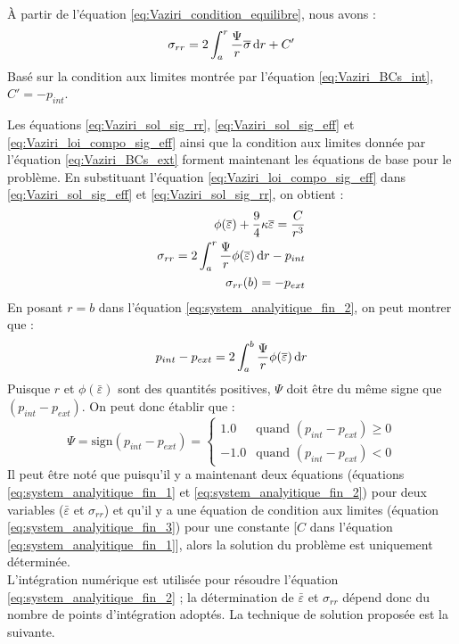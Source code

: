 \documentclass[10pt]{book}
\begin{document}
À partir de l'équation \eqref{eq:Vaziri_condition_equilibre}, nous avons :
\begin{equation}
\sigma_{rr} = 2\int_a^r\frac{\Psi}{r}\overline{\sigma}\,\mathrm{d}r + C'
\label{eq:Vaziri_sol_sig_rr}
\end{equation}
Basé sur la condition aux limites montrée par l'équation \eqref{eq:Vaziri_BCs_int}, $C' = -p_{int}$.

Les équations \eqref{eq:Vaziri_sol_sig_rr}, \eqref{eq:Vaziri_sol_sig_eff} et \eqref{eq:Vaziri_loi_compo_sig_eff} ainsi que la condition aux limites donnée par l'équation \eqref{eq:Vaziri_BCs_ext} forment maintenant les équations de base pour le problème. En substituant l'équation \eqref{eq:Vaziri_loi_compo_sig_eff} dans \eqref{eq:Vaziri_sol_sig_eff} et \eqref{eq:Vaziri_sol_sig_rr}, on obtient :
\begin{align}\label{eq:system_analyitique_fin_1}
\phi(\overline{\varepsilon}) + \frac{9}{4}\kappa\overline{\varepsilon} = \frac{C}{r^3}\\\label{eq:system_analyitique_fin_2}
\sigma_{rr} = 2\int_a^r\frac{\Psi}{r}\phi(\overline{\varepsilon})\,\mathrm{d}r - p_{int}\\\label{eq:system_analyitique_fin_3}
\sigma_{rr}(b) = -p_{ext}
\end{align}
En posant $r = b$ dans l'équation \eqref{eq:system_analyitique_fin_2}, on peut montrer que :
$$p_{int} - p_{ext} = 2\int_a^b\frac{\Psi}{r}\phi(\overline{\varepsilon})\,\mathrm{d}r$$
Puisque $r$ et $\phi(\bar{\varepsilon})$ sont des quantités positives, $\Psi$ doit être du même signe que $(p_{int} - p_{ext})$. On peut donc établir que :
\begin{equation}
\Psi = \text{sign}(p_{int} - p_{ext}) = \begin{cases}
1.0 & \text{quand } (p_{int} - p_{ext}) \geq 0\\
-1.0 & \text{quand } (p_{int} - p_{ext}) < 0
\end{cases}
\label{eq:forme_alternative_Psi}
\end{equation}
Il peut être noté que puisqu'il y a maintenant deux équations (équations \eqref{eq:system_analyitique_fin_1} et \eqref{eq:system_analyitique_fin_2}) pour deux variables ($\bar{\varepsilon}$ et $\sigma_{rr}$) et qu'il y a une équation de condition aux limites (équation \eqref{eq:system_analyitique_fin_3}) pour une constante [$C$ dans l'équation \eqref{eq:system_analyitique_fin_1}], alors la solution du problème est uniquement déterminée.\\

L'intégration numérique est utilisée pour résoudre l'équation \eqref{eq:system_analyitique_fin_2} ; la détermination de $\bar{\varepsilon}$ et $\sigma_{rr}$ dépend donc du nombre de points d'intégration adoptés. La technique de solution proposée est la suivante.
\end{document}
